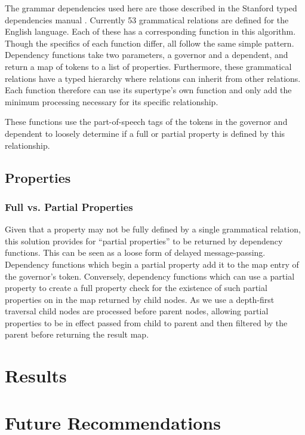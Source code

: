 \documentclass[11pt]{article}
\begin{document}
The grammar dependencies used here are those described in the Stanford typed dependencies manual \cite{stanforddep}.  Currently 53 grammatical relations are defined for the English language.  Each of these has a corresponding function in this algorithm.  Though the specifics of each function differ, all follow the same simple pattern.  Dependency functions take two parameters, a governor and a dependent, and return a map of tokens to a list of properties.  Furthermore, these grammatical relations have a typed hierarchy where relations can inherit from other relations.  Each function therefore can use its supertype's own function and only add the minimum processing necessary for its specific relationship.

These functions use the part-of-speech tags of the tokens in the governor and dependent to loosely determine if a full or partial property is defined by this relationship.



\subsection{Properties}
\label{algo:properties}

\subsubsection{Full vs. Partial Properties}

Given that a property may not be fully defined by a single grammatical relation, this solution provides for ``partial properties'' to be returned by dependency functions.  This can be seen as a loose form of delayed message-passing.  Dependency functions which begin a partial property add it to the map entry of the governor's token.  Conversely, dependency functions which can use a partial property to create a full property check for the existence of such partial properties on in the map returned by child nodes.  As we use a depth-first traversal child nodes are processed before parent nodes, allowing partial properties to be in effect passed from child to parent and then filtered by the parent before returning the result map.



\section{Results}

\section{Future Recommendations}
\end{document}
